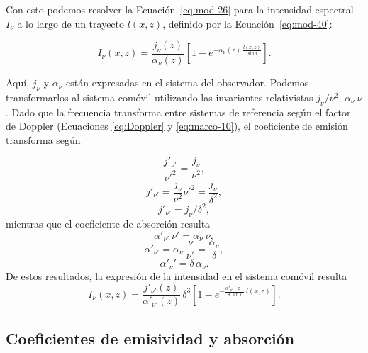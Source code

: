 Con esto podemos resolver la Ecuación~\eqref{eq:mod-26} para la {intensidad espectral} $I_\nu$ a lo largo de un trayecto $l(x, z)$, definido por la Ecuación~\eqref{eq:mod-40}:


\begin{equation}\label{eq:mod-37}
    I_\nu(x, z) = \frac{j_\nu(z)}{\alpha_\nu(z)}
    \left[ 1 - e^{-\alpha_\nu(z)\, \frac{l(x, z)}{\sin i}} \right].
\end{equation}

	Aquí, $j_\nu$ y $\alpha_\nu$ están expresadas en el sistema del observador.
	Podemos transformarlos al sistema com\'ovil utilizando las invariantes relativistas $j_\nu/\nu^2$, $\alpha_\nu~\nu$.
	Dado que la frecuencia transforma entre sistemas de referencia seg\'un el factor de Doppler (Ecuaciones \eqref{eq:Doppler} y \eqref{eq:marco-10}), el coeficiente de emisi\'on transforma seg\'un

\begin{equation*}
\frac{j'_{\nu'}}{\nu'^2} =\frac{j_\nu}{\nu^2} ,
\end{equation*}
\begin{equation}\label{eq:mod-37b}
{j'_{\nu'}} =\frac{j_\nu}{\nu^2}\nu'^2 = \frac{j_{\nu}}{\delta^2},
\end{equation}
\begin{equation*}
j'_{\nu'} = j_\nu / \delta^2,
\end{equation*}
mientras que el coeficiente de absorci\'on resulta
\begin{equation*}\label{eq:mod-37c}
\alpha'_{\nu'}~\nu' = \alpha_\nu~\nu,
\end{equation*}
\begin{equation}
\alpha'_{\nu'} = \alpha_{\nu}~\frac{\nu}{\nu'}=\frac{\alpha_{\nu}}{\delta},
\end{equation}
\begin{equation*}
\alpha'_\nu' = \delta\, \alpha_\nu.
\end{equation*}
	De estos resultados, la expresi\'on de la intensidad en el sistema comóvil resulta
\begin{equation}
     I_{\nu}(x, z) = \frac{j'_{\nu'}(z)}{\alpha'_{\nu'}(z)}\, \delta^3
    \left[ 1 - e^{-\frac{\alpha'_{\nu'}(z)}{\delta~\sin i}\, l(x, z)} \right].
    \label{eq:mod-38}
\end{equation}

\subsection{Coeficientes de emisividad y absorci\'on}

